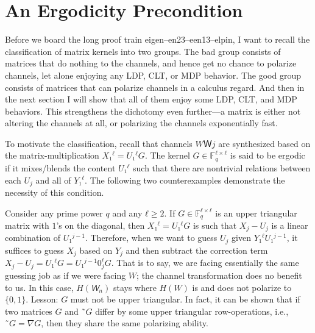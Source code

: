 \documentclass[openany]{amsbook}
\numberwithin{equation}{chapter}
\numberwithin{figure}{chapter}
\numberwithin{table}{chapter}
\theoremstyle{definition}	理dfn:Definition~?s			理exa:Example~?s
\theoremstyle{remark}		理cla:Claim~?s				理rem:Remark~?s
\begin{document}
\section{An Ergodicity Precondition}\label{sec:ergodic}

	\def\nabla{\tikz\draw(2em/3,0)|-(0,2em/3)--cycle;}
	
	Before we board the long proof train eigen--en23--een13--elpin,
	I want to recall the classification of matrix kernels into two groups.
	The bad group consists of matrices that do nothing to the channels, and hence get
	no chance to polarize channels, let alone enjoying any LDP, CLT, or MDP behavior.
	The good group consists of matrices that can polarize channels in a calculus regard.
	And then in the next section I will show that all of them
	enjoy some LDP, CLT, and MDP behaviors.
	This strengthens the dichotomy even further---a matrix is either not altering
	the channels at all, or polarizing the channels exponentially fast.
	
	To motivate the classification, recall that channels $WＷj$
	are synthesized based on the matrix-multiplication $X₁^ℓ=U₁^ℓG$.
	The kernel $G∈𝔽_q^{ℓ×ℓ}$ is said to be ergodic if it mixes/blends the content $U₁^ℓ$
	such that there are nontrivial relations between each $U_j$ and all of $Y₁^ℓ$.
	The following two counterexamples demonstrate the necessity of this condition.
	
	\begin{exa}
		Consider any prime power $q$ and any $ℓ≥2$.
		If $G∈𝔽_q^{ℓ×ℓ}$ is an upper triangular matrix with $1$'s on the diagonal,
		then $X₁^ℓ=U₁^ℓG$ is such that $X_j-U_j$ is a linear combination of $U₁^{j-1}$.
		Therefore, when we want to guess $U_j$ given $Y₁^ℓU₁^{j-1}$,
		it suffices to guess $X_j$ based on $Y_j$ and then
		subtract the correction term $X_j-U_j=U₁^ℓG=U₁^{j-1}0_j^ℓG$.
		That is to say, we are facing essentially
		the same guessing job as if we were facing $W$;
		the channel transformation does no benefit to us.
		In this case, $H(𝘞_n)$ stays where $H(W)$ is
		and does not polarize to $\{0,1\}$.
		Lesson:
		$G$ must not be upper triangular.
		In fact, it can be shown that if two matrices $G$ and $˜G$
		differ by some upper triangular row-operations, i.e., $˜G=∇G$,
		then they share the same polarizing ability.
	\end{exa}
	
\end{document}
